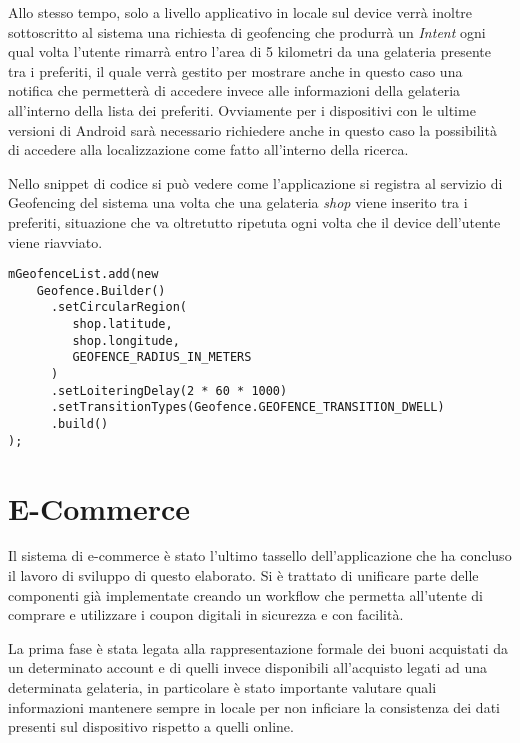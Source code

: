 Allo stesso tempo, solo a livello applicativo in locale sul device
verrà inoltre sottoscritto al sistema una richiesta di geofencing
che produrrà un \emph{Intent} ogni qual volta l'utente rimarrà entro
l'area di 5 kilometri da una gelateria presente tra i preferiti, il
quale verrà gestito per mostrare anche in questo caso una notifica
che permetterà di accedere invece alle informazioni della gelateria
all'interno della lista dei preferiti. Ovviamente per i dispositivi
con le ultime versioni di Android sarà necessario richiedere anche
in questo caso la possibilità di accedere alla localizzazione come
fatto all'interno della ricerca.

Nello snippet di codice si può vedere come l'applicazione si registra
al servizio di Geofencing del sistema una volta che una gelateria
\emph{shop} viene inserito tra i preferiti, situazione che va oltretutto
ripetuta ogni volta che il device dell'utente viene riavviato.

\begin{lstlisting}
mGeofenceList.add(new
    Geofence.Builder()  
      .setCircularRegion(                                             
         shop.latitude,                                             
         shop.longitude,                                             
         GEOFENCE_RADIUS_IN_METERS                                     
      )                                     
      .setLoiteringDelay(2 * 60 * 1000)                                     
      .setTransitionTypes(Geofence.GEOFENCE_TRANSITION_DWELL)                                     
      .build()
);
\end{lstlisting}

\section{E-Commerce}

Il sistema di e-commerce è stato l'ultimo tassello dell'applicazione
che ha concluso il lavoro di sviluppo di questo elaborato. Si è trattato
di unificare parte delle componenti già implementate creando un workflow
che permetta all'utente di comprare e utilizzare i coupon digitali
in sicurezza e con facilità.

La prima fase è stata legata alla rappresentazione formale dei buoni
acquistati da un determinato account e di quelli invece disponibili
all'acquisto legati ad una determinata gelateria, in particolare è
stato importante valutare quali informazioni mantenere sempre in locale
per non inficiare la consistenza dei dati presenti sul dispositivo
rispetto a quelli online.

